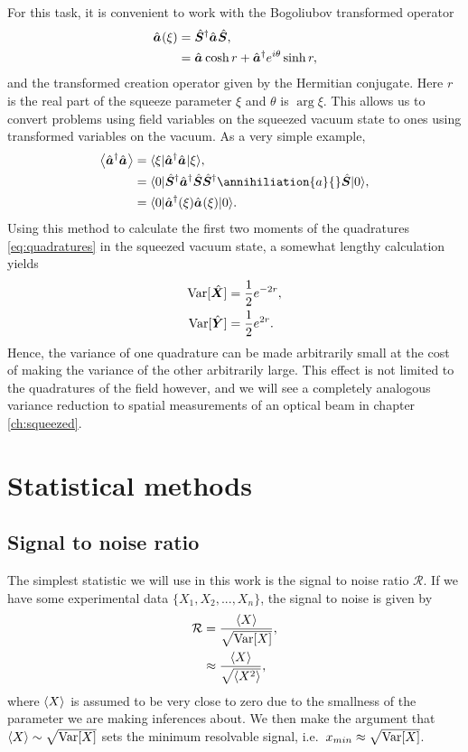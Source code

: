 For this task, it is convenient to work with the Bogoliubov transformed operator
\begin{align}
  \hat{\bm a}_{}(\xi) &= \hat{\bm S}^\dagger \hat{\bm a}_{} \hat{\bm S}, \nonumber \\
                          &= \hat{\bm a}_{} \cosh r + \hat{\bm a}^\dagger_{} e^{i\theta}\sinh r,
\end{align}
and the transformed creation operator given by the Hermitian conjugate.  Here $r$ is the real part of the squeeze parameter $\xi$ and $\theta$ is $\arg{\xi}$.  This allows us to convert problems using field variables on the squeezed vacuum state to ones using transformed variables on the vacuum.  As a very simple example,
\begin{align}
  \mean{\numberop{a}{}} &= \bra{\xi}\numberop{a}{}\ket{\xi}, \nonumber \\
                            &= \bra{0}\op{S}^\dagger \creation{a}{} \op{S}\op{S}^\dagger \annihiliation{a}{} \op{S} \ket{0}, \nonumber \\
                            &= \bra{0}\creation{a}{}(\xi) \annihilation{a}{}(\xi)\ket{0}.
\end{align}
Using this method to calculate the first two moments of the quadratures \eqref{eq:quadratures} in the squeezed vacuum state, a somewhat lengthy calculation yields
\begin{align}
  {\rm {Var}}[\hat{\bm X}] &= \frac{1}{2}e^{-2r}, \nonumber \\
  {\rm {Var}}[\hat{\bm Y}] &= \frac{1}{2}e^{2r}.
\end{align}
Hence, the variance of one quadrature can be made arbitrarily small at the cost of making the variance of the other arbitrarily large.  This effect is not limited to the quadratures of the field however, and we will see a completely analogous variance reduction to spatial measurements of an optical beam in chapter \ref{ch:squeezed}.

\section{Statistical methods}
\subsection{Signal to noise ratio}
The simplest statistic we will use in this work is the signal to noise ratio $\mathcal{R}$.  If we have some experimental data $\{X_1, X_2,..., X_n\}$, the signal to noise is given by
\begin{align}
  \nonumber  \mathcal{R} &= \frac{\left\langle X \right\rangle}{\sqrt{{\rm {Var}}[X]}}, \\
                         &\approx \frac{\left\langle X \right\rangle}{\sqrt{\left\langle X^2 \right\rangle}}, 
\end{align}
where $\left\langle X \right\rangle$ is assumed to be very close to zero due to the smallness of the parameter we are making inferences about.  We then make the argument that $\left\langle X \right\rangle \sim \sqrt{{\rm {Var}}[X]}$ sets the minimum resolvable signal, i.e.~$x_{min} \approx \sqrt{{\rm {Var}}[X]}$.  


